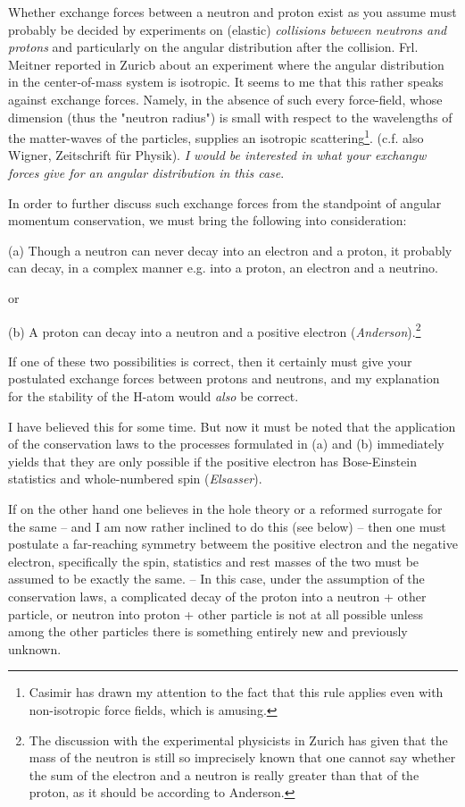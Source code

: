 \documentclass{article}
\begin{document}
Whether exchange forces between a neutron and proton exist as you assume must probably be decided by experiments on (elastic) \textit{collisions between neutrons and protons} and particularly on the angular distribution after the collision. Frl. Meitner reported in Zuricb about an experiment where the angular distribution in the center-of-mass system is isotropic. It seems to me that this rather speaks against exchange forces. Namely, in the absence of such  every force-field, whose dimension (thus the "neutron radius") is small with respect to the wavelengths of the matter-waves of the particles, supplies an isotropic scattering\footnote{Casimir has drawn my attention to the fact that this rule applies even with non-isotropic force fields, which is amusing.}. (c.f. also Wigner, Zeitschrift für Physik). \textit{I would be interested in what your exchangw forces give for an angular distribution in this case}.

In order to further discuss such exchange forces from the standpoint of angular momentum conservation, we must bring the following into consideration:

(a) Though a neutron can never decay into an electron and a proton, it probably can decay, in a complex manner e.g. into a proton, an electron and a neutrino.

or

(b) A proton can decay into a neutron and a positive electron (\textit{Anderson}).\footnote{The discussion with the experimental physicists in Zurich has given that the mass of the neutron is still so imprecisely known that one cannot say whether the sum of the electron and a neutron is really greater than that of the proton, as it should be according to Anderson.}

If one of these two possibilities is correct, then it certainly must give your postulated exchange forces between protons and neutrons, and my explanation for the stability of the H-atom would \textit{also} be correct.

I have believed this for some time. But now it must be noted that the application of the conservation laws to the processes formulated in (a) and (b) immediately yields that they are only possible if the positive electron has Bose-Einstein statistics and whole-numbered spin (\textit{Elsasser}).

If on the other hand one believes in the hole theory or a reformed surrogate for the same -- and I am now rather inclined to do this (see below) -- then one must postulate a far-reaching symmetry betweem the positive electron and the negative electron, specifically the spin, statistics and rest masses of the two must be assumed to be exactly the same. -- In this case, under the assumption of the conservation laws, a complicated decay of the proton into a neutron + other particle, or neutron into proton + other particle is not at all possible unless among the other particles there is something entirely new and previously unknown.
\end{document}
